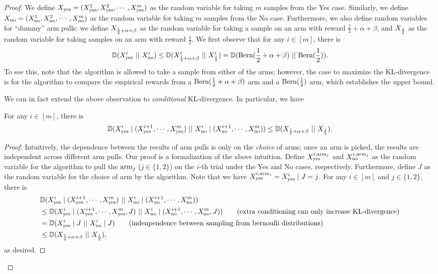 \begin{proof}
	We define $X_{\text{yes}}=(X_{\text{yes}}^{1}, X_{\text{yes}}^{2}, \cdots, X_{\text{yes}}^{m})$ as the random variable for taking $m$ samples from the Yes case. 
	Similarly, we define $X_{\text{no}}=(X_{\text{no}}^{1}, X_{\text{no}}^{2}, \cdots, X_{\text{no}}^{m})$ as the random variable for taking $m$ samples from the No case. 
	Furthermore, we also define random variables for ``dummy'' arm pulls: we define $X_{\frac{1}{2}+\alpha+\beta}$ as the random variable for taking a sample on an arm with reward $\frac{1}{2}+\alpha+\beta$, and $X_{\frac{1}{2}}$ as the random variable for taking samples on an arm with reward $\frac{1}{2}$.
	We first observe that for any $i\in [m]$, there is 
	\begin{align*}
		\mathbb{D}(X_{\text{yes}}^{i}~||~X_{\text{no}}^{i})\leq \mathbb{D}(X_{\frac{1}{2}+\alpha+\beta}^{i}~||~X_{\frac{1}{2}}^{i}) =  \mathbb{D}(\textnormal{Bern}(\frac{1}{2}+\alpha+\beta)~||~\textnormal{Bern}(\frac{1}{2})).
	\end{align*}
	To see this, note that the algorithm is allowed to take a sample from either of the arms; however, the case to maximize the KL-divergence is for the algorithm to compare the empirical rewards from a $\textnormal{Bern}(\frac{1}{2}+\alpha+\beta)$ arm and a $\textnormal{Bern}(\frac{1}{2})$ arm, which establishes the upper bound.
	
	We can in fact extend the above observation to \emph{conditional} KL-divergence. In particular, we have
	
	\begin{claim}
		\label{clm:cross-trial-ub}
		For any $i\in [m]$, there is
		\begin{align*}
			\mathbb{D}(X_{\text{yes}}^{i}\mid (X_{\text{yes}}^{i+1},\cdots, X_{\text{yes}}^{m})~||~X_{\text{no}}^{i}\mid (X_{\text{no}}^{i+1},\cdots, X_{\text{no}}^{m})) \leq \mathbb{D}(X_{\frac{1}{2}+\alpha+\beta}~||~X_{\frac{1}{2}}).
		\end{align*}
	\end{claim}
	\begin{proof}
		Intuitively, the dependence between the results of arm pulls is only on the \emph{choice} of arms; once an arm is picked, the results are independent across different arm pulls. Our proof is a formalization of the above intuition. Define $X_{\text{yes}}^{i, \textnormal{arm}_j}$ and $X_{\text{no}}^{i, \textnormal{arm}_j}$ as the random variable for the algorithm to pull the $\textnormal{arm}_{j}$ ($j\in \{1,2\}$) on the $i$-th trial under the Yes and No cases, respectively. Furthermore, define $J$ as the random variable for the choice of arm by the algorithm. Note that we have $X_{\text{yes}}^{i, \textnormal{arm}_j} = X_{\text{yes}}^{i}\mid J=j$. %
		For any $i\in [m]$ and $j\in\{1,2\}$, there is
		\begin{align*}
			& \mathbb{D}(X_{\text{yes}}^{i}\mid (X_{\text{yes}}^{i+1},\cdots, X_{\text{yes}}^{m})~||~X_{\text{no}}^{i}\mid (X_{\text{no}}^{i+1},\cdots, X_{\text{no}}^{m})) \\
			& \leq \mathbb{D}(X_{\text{yes}}^{i}\mid (X_{\text{yes}}^{i+1},\cdots, X_{\text{yes}}^{m}, J)~||~X_{\text{no}}^{i}\mid (X_{\text{no}}^{i+1},\cdots, X_{\text{no}}^{m}, J))  \tag{extra conditioning can only increase KL-divergence}\\
			& = \mathbb{D}(X_{\text{yes}}^{i}\mid J~||~X_{\text{no}}^{i}\mid J) \tag{indenpendence between sampling from bernoulli distributions}\\
			& \leq \mathbb{D}(X_{\frac{1}{2}+\alpha+\beta}~||~X_{\frac{1}{2}}),
		\end{align*}
		as desired. 
	\end{proof}
	

\end{proof}
